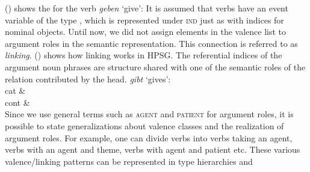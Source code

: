 () shows the \contv for the verb \emph{geben} `give':
\ea
\label{mrs-geben}
\z
It is assumed that verbs have an event variable of the type , which is represented under \textsc{ind} just as with indices for nominal objects.
Until now, we did not assign elements in the valence list to argument roles in the semantic representation. This connection is referred to
as \emph{linking}. () shows how linking works in HPSG. The referential indices of the argument
noun phrases are structure shared with one of the semantic roles of the relation contributed by the
head.
\ea
\label{le-geben}
\emph{gibt} `gives':\\
\ms
{ cat &  \\
  cont &   \\
}
\z
Since we use general terms such as \textsc{agent} and \textsc{patient} for argument roles, it is possible to state generalizations about valence classes and
the realization of argument roles. For example, one can divide verbs into verbs taking an agent, verbs with an agent and theme, verbs with agent and patient etc.
These various valence/linking patterns can be represented in type hierarchies and
